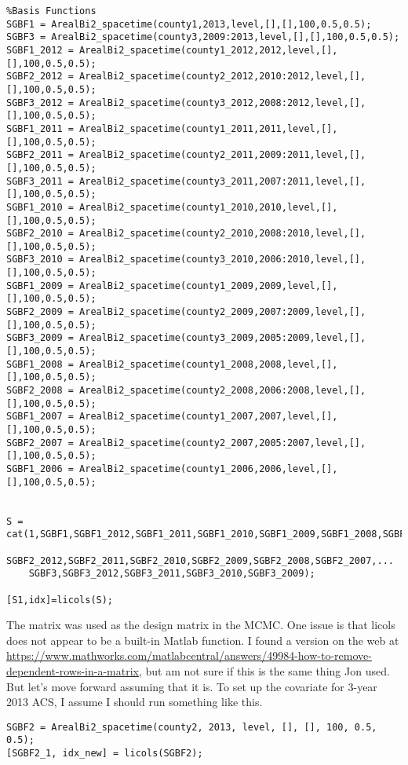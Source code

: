 \documentclass[10pt]{article}
\begin{document}
\begin{lstlisting}
%Basis Functions
SGBF1 = ArealBi2_spacetime(county1,2013,level,[],[],100,0.5,0.5);
SGBF3 = ArealBi2_spacetime(county3,2009:2013,level,[],[],100,0.5,0.5);
SGBF1_2012 = ArealBi2_spacetime(county1_2012,2012,level,[],[],100,0.5,0.5);
SGBF2_2012 = ArealBi2_spacetime(county2_2012,2010:2012,level,[],[],100,0.5,0.5);
SGBF3_2012 = ArealBi2_spacetime(county3_2012,2008:2012,level,[],[],100,0.5,0.5);
SGBF1_2011 = ArealBi2_spacetime(county1_2011,2011,level,[],[],100,0.5,0.5);
SGBF2_2011 = ArealBi2_spacetime(county2_2011,2009:2011,level,[],[],100,0.5,0.5);
SGBF3_2011 = ArealBi2_spacetime(county3_2011,2007:2011,level,[],[],100,0.5,0.5);
SGBF1_2010 = ArealBi2_spacetime(county1_2010,2010,level,[],[],100,0.5,0.5);
SGBF2_2010 = ArealBi2_spacetime(county2_2010,2008:2010,level,[],[],100,0.5,0.5);
SGBF3_2010 = ArealBi2_spacetime(county3_2010,2006:2010,level,[],[],100,0.5,0.5);
SGBF1_2009 = ArealBi2_spacetime(county1_2009,2009,level,[],[],100,0.5,0.5);
SGBF2_2009 = ArealBi2_spacetime(county2_2009,2007:2009,level,[],[],100,0.5,0.5);
SGBF3_2009 = ArealBi2_spacetime(county3_2009,2005:2009,level,[],[],100,0.5,0.5);
SGBF1_2008 = ArealBi2_spacetime(county1_2008,2008,level,[],[],100,0.5,0.5);
SGBF2_2008 = ArealBi2_spacetime(county2_2008,2006:2008,level,[],[],100,0.5,0.5);
SGBF1_2007 = ArealBi2_spacetime(county1_2007,2007,level,[],[],100,0.5,0.5);
SGBF2_2007 = ArealBi2_spacetime(county2_2007,2005:2007,level,[],[],100,0.5,0.5);
SGBF1_2006 = ArealBi2_spacetime(county1_2006,2006,level,[],[],100,0.5,0.5);


S = cat(1,SGBF1,SGBF1_2012,SGBF1_2011,SGBF1_2010,SGBF1_2009,SGBF1_2008,SGBF1_2007,SGBF1_2006,...
    SGBF2_2012,SGBF2_2011,SGBF2_2010,SGBF2_2009,SGBF2_2008,SGBF2_2007,...
    SGBF3,SGBF3_2012,SGBF3_2011,SGBF3_2010,SGBF3_2009);

[S1,idx]=licols(S);
\end{lstlisting}
%
The matrix  was used as the design matrix in the MCMC. One issue is that licols does not appear to be a built-in Matlab function. I found a version on the web at \url{https://www.mathworks.com/matlabcentral/answers/49984-how-to-remove-dependent-rows-in-a-matrix}, but am not sure if this is the same thing Jon used. But let's move forward assuming that it is. To set up the covariate for 3-year 2013 ACS, I assume I should run something like this.
%
\begin{lstlisting}
SGBF2 = ArealBi2_spacetime(county2, 2013, level, [], [], 100, 0.5, 0.5);
[SGBF2_1, idx_new] = licols(SGBF2);
\end{lstlisting}
\end{document}
